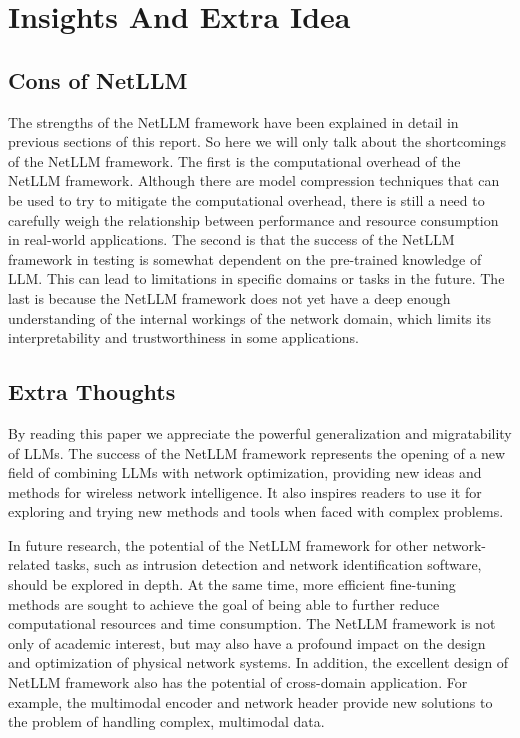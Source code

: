 \documentclass[twocolumn]{article}
\begin{document}
\section{Insights And Extra Idea}

\subsection{Cons of NetLLM}
The strengths of the NetLLM framework have been explained in detail in previous sections of this report. So here we will only talk about the shortcomings of the NetLLM framework. The first is the computational overhead of the NetLLM framework. Although there are model compression techniques that can be used to try to mitigate the computational overhead, there is still a need to carefully weigh the relationship between performance and resource consumption in real-world applications. The second is that the success of the NetLLM framework in testing is somewhat dependent on the pre-trained knowledge of LLM. This can lead to limitations in specific domains or tasks in the future. The last is because the NetLLM framework does not yet have a deep enough understanding of the internal workings of the network domain, which limits its interpretability and trustworthiness in some applications.

\subsection{Extra Thoughts}
By reading this paper we appreciate the powerful generalization and migratability of LLMs. The success of the NetLLM framework represents the opening of a new field of combining LLMs with network optimization, providing new ideas and methods for wireless network intelligence. It also inspires readers to use it for exploring and trying new methods and tools when faced with complex problems.

In future research, the potential of the NetLLM framework for other network-related tasks, such as intrusion detection and network identification software, should be explored in depth. At the same time, more efficient fine-tuning methods are sought to achieve the goal of being able to further reduce computational resources and time consumption. The NetLLM framework is not only of academic interest, but may also have a profound impact on the design and optimization of physical network systems. In addition, the excellent design of NetLLM framework also has the potential of cross-domain application. For example, the multimodal encoder and network header provide new solutions to the problem of handling complex, multimodal data.
\end{document}
